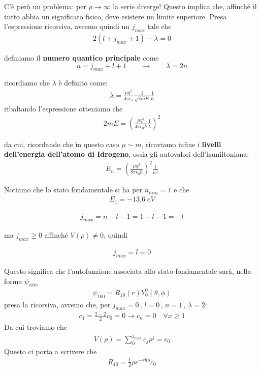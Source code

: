 C'è però un problema: per $\rho \rightarrow \infty$ la serie diverge! Questo implica che, affinché il tutto abbia un significato fisico, deve esistere un limite superiore. Presa l'espressione ricorsiva, avremo quindi un $j_{max}$ tale che
\begin{align}
2(l + j_{max} +1) - \lambda=0
\end{align}

definiamo il \textbf{numero quantico principale} come
\begin{equation}
n= j_{max} + l + 1 \qquad \rightarrow \qquad \lambda = 2n
\end{equation}

ricordiamo che $\lambda$ è definito come:
\begin{align}
\lambda = \frac{\mu q^2}{4 \pi \epsilon_0} \frac{1}{\sqrt{smE}}\frac{1}{\hbar}
\end{align}
ribaltando l'espressione otteniamo che
\begin{align}
2mE= \left( \frac{\mu q^2}{4 \pi \epsilon_0 \hbar} \frac{1}{\lambda} \right)^2 
\end{align}

da cui, ricordando che in questo caso $\mu \sim m$, ricaviamo infine i \textbf{livelli dell'energia dell'atomo di Idrogeno}, ossia gli autovalori dell'hamiltoniana:
\begin{align}
E_n= \left( \frac{\mu q^2}{8 \pi \epsilon_0 \hbar} \right)^2 \frac{1}{n^2}
\end{align}

Notiamo che lo stato fondamentale si ha per $n_{min}=1$ e che 
\begin{align}
E_1= -13.6 \; eV
\end{align}

\begin{align}
j_{max}= n-l-1 = 1-l -1=-l
\end{align}

ma $j_{max} \geq 0$ affinché $V(\rho) \neq 0$, quindi 

\begin{align}
j_{max}=l=0
\end{align}

\newpage

Questo significa che l'autofunzione associata allo stato fondamentale sarà, nella forma $\psi_{nlm}$
\begin{align}
\psi_{100}= R_{10}(r)Y_0^0(\theta, \phi) 
\end{align}
presa la ricorsiva, avremo che, per $j_{max} = 0 \, , \, l=0\, , \, n=1 \, , \, \lambda=2$:
\begin{align}
 c_1 = \frac{2-2}{2}c_0=0 \rightarrow c_n=0 \quad \forall x \geq 1
\end{align}
Da cui troviamo che
\begin{align}
V(\rho)= \sum_0^{j_{max}} c_j\rho^j = c_0
\end{align}
Questo ci porta a scrivere che
\begin{align}
R_{1 0}= \frac{1}{2}\rho e^{-rho}c_0
\end{align}

